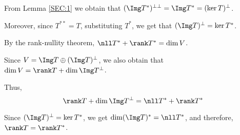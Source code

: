\documentclass[11pt]{scrartcl}
\begin{document}
From Lemma \ref{SEC:1} we obtain that \((\Img T^{*})^{\bot\bot} = \Img T^{*} = (\ker T)^{\bot}\).

Moreover, since \(T^{**} = T\), substituting \(T^{*}\), we get that \((\Img T)^{\bot} = \ker T^{*}\).

By the rank-nullity theorem, \(\nll T^{*} + \rank T^{*} = \dim V\). 

Since \(V = \Img T\oplus (\Img T)^{\bot}\), we also obtain that \(\dim V
= \rank T + \dim \Img T^{\bot}\).

Thus, 
\[\rank T + \dim \Img T^{\bot} = \nll T^{*} + \rank T^{*}\]

Since \((\Img T)^{\bot} = \ker T^{*}\), we get \(\dim (\Img T)^{*} = \nll
T^{*}\), and therefore, \(\rank T = \rank T^{*}\).
\end{document}
